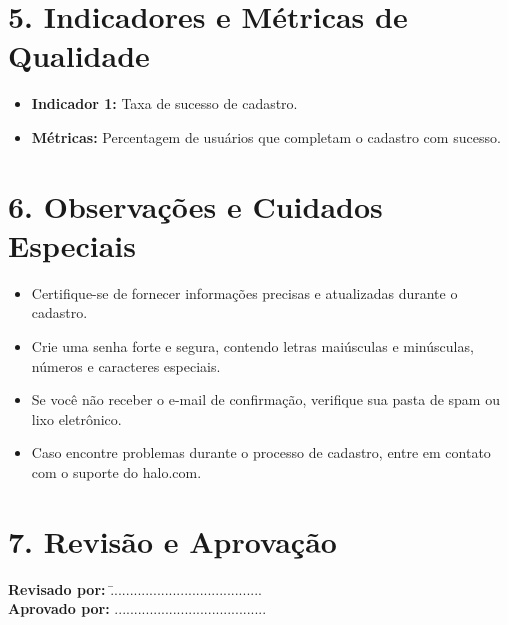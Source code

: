 \documentclass[a4paper,12pt]{article}
\begin{document}
\section*{5. Indicadores e Métricas de Qualidade}
\begin{itemize}
    \item \textbf{Indicador 1:} Taxa de sucesso de cadastro.
    \item \textbf{Métricas:} Percentagem de usuários que completam o cadastro com sucesso.
\end{itemize}

\section*{6. Observações e Cuidados Especiais}
\begin{itemize}
    \item Certifique-se de fornecer informações precisas e atualizadas durante o cadastro.
    \item Crie uma senha forte e segura, contendo letras maiúsculas e minúsculas, números e caracteres especiais.
    \item Se você não receber o e-mail de confirmação, verifique sua pasta de spam ou lixo eletrônico.
    \item Caso encontre problemas durante o processo de cadastro, entre em contato com o suporte do halo.com.
\end{itemize}

\section*{7. Revisão e Aprovação}
\begin{tabbing}
    \hspace{5cm} \= \textbf{Revisado por:} \hspace{2cm} \= ....................................... \\
    \hspace{5cm} \> \textbf{Aprovado por:} \> ....................................... \\
\end{tabbing}
\end{document}
